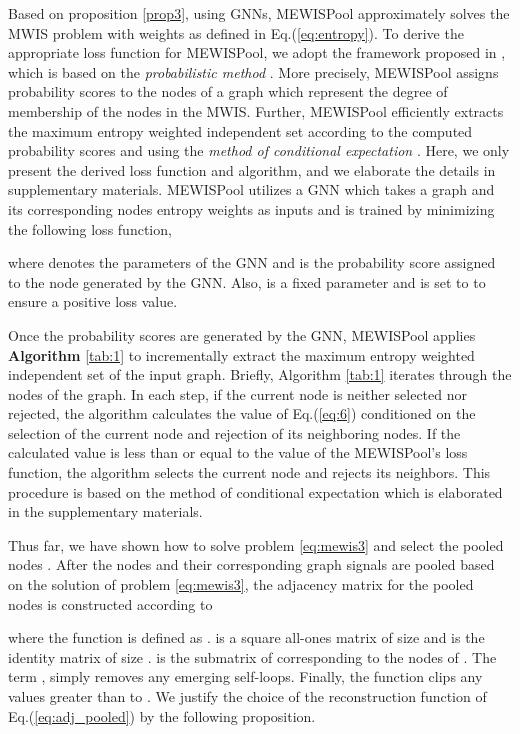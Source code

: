 \documentclass{article}
\begin{document}
Based on proposition \ref{prop3}, using GNNs, MEWISPool approximately solves the MWIS problem with weights as defined in Eq.(\ref{eq:entropy}). To derive the appropriate loss function for MEWISPool, we adopt the framework proposed in \cite{erdos}, which is based on the \textit{probabilistic method} \cite{erdos1959graph, probabilisticmethod}. More precisely, MEWISPool assigns probability scores to the nodes of a graph which represent the degree of membership of the nodes in the MWIS. Further, MEWISPool efficiently extracts the maximum entropy weighted independent set according to the computed probability scores and using the \textit{method of conditional expectation} \cite{raghavan}. Here, we only present the derived loss function and algorithm, and we elaborate the details in supplementary materials. MEWISPool utilizes a GNN which takes a graph and its corresponding nodes entropy weights as inputs and is trained by minimizing the following loss function,

where  denotes the parameters of the GNN and  is the probability score assigned to the node  generated by the GNN. Also,  is a fixed parameter and is set to  to ensure a positive loss value.

Once the probability scores are generated by the GNN, MEWISPool applies \textbf{Algorithm} \ref{tab:1} to incrementally extract the maximum entropy weighted independent set of the input graph. Briefly, Algorithm \ref{tab:1} iterates through the nodes of the graph. In each step, if the current node is neither selected nor rejected, the algorithm calculates the value of Eq.(\ref{eq:6}) conditioned on the selection of the current node and rejection of its neighboring nodes. If the calculated value is less than or equal to the value of the MEWISPool's loss function, the algorithm selects the current node and rejects its neighbors. This procedure is based on the method of conditional expectation which is elaborated in the supplementary materials.

Thus far, we have shown how to solve problem \ref{eq:mewis3} and select the pooled nodes . After the nodes and their corresponding graph signals are pooled based on the solution of problem \ref{eq:mewis3}, the adjacency matrix for the pooled nodes is constructed according to

where the function  is defined as .  is a square all-ones matrix of size  and  is the identity matrix of size .  is the submatrix of  corresponding to the nodes of . The term , simply removes any emerging self-loops. Finally, the  function clips any values greater than  to . We justify the choice of the reconstruction function of Eq.(\ref{eq:adj_pooled}) by the following proposition.
\end{document}
